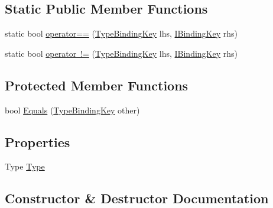 \subsection*{Static Public Member Functions}
\begin{DoxyCompactItemize}
\item 
static bool \mbox{\hyperlink{classcp_games_1_1core_1_1_rapid_m_v_c_1_1_type_binding_key_ae31fb51cbbb8b3dadedd590bbe23d408}{operator==}} (\mbox{\hyperlink{classcp_games_1_1core_1_1_rapid_m_v_c_1_1_type_binding_key}{Type\+Binding\+Key}} lhs, \mbox{\hyperlink{interfacecp_games_1_1core_1_1_rapid_m_v_c_1_1_i_binding_key}{I\+Binding\+Key}} rhs)
\item 
static bool \mbox{\hyperlink{classcp_games_1_1core_1_1_rapid_m_v_c_1_1_type_binding_key_a0f718ef1faa44c8c730f45637990e99a}{operator !=}} (\mbox{\hyperlink{classcp_games_1_1core_1_1_rapid_m_v_c_1_1_type_binding_key}{Type\+Binding\+Key}} lhs, \mbox{\hyperlink{interfacecp_games_1_1core_1_1_rapid_m_v_c_1_1_i_binding_key}{I\+Binding\+Key}} rhs)
\end{DoxyCompactItemize}
\subsection*{Protected Member Functions}
\begin{DoxyCompactItemize}
\item 
bool \mbox{\hyperlink{classcp_games_1_1core_1_1_rapid_m_v_c_1_1_type_binding_key_abaa2ed80522ff281223cb0e676cffd09}{Equals}} (\mbox{\hyperlink{classcp_games_1_1core_1_1_rapid_m_v_c_1_1_type_binding_key}{Type\+Binding\+Key}} other)
\end{DoxyCompactItemize}
\subsection*{Properties}
\begin{DoxyCompactItemize}
\item 
Type \mbox{\hyperlink{classcp_games_1_1core_1_1_rapid_m_v_c_1_1_type_binding_key_a2607ca6b5f825138867c84fb68fb159e}{Type}}
\end{DoxyCompactItemize}


\subsection{Constructor \& Destructor Documentation}
\mbox{\label{classcp_games_1_1core_1_1_rapid_m_v_c_1_1_type_binding_key_a37a31860d5b1467370a4491d4a1d8232}} 
